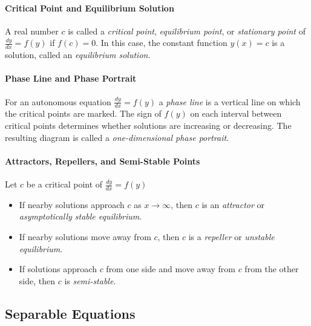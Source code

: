 \documentclass[oneside]{book}
\begin{document}
\paragraph{Critical Point and Equilibrium Solution}{
    A real number $c$ is called a \emph{critical point}, \emph{equilibrium point}, or
    \emph{stationary point} of $\frac{dy}{dx}=f(y)$ if $f(c)=0$. In this case, the constant function $y(x)=c$ is a solution, called an \emph{equilibrium solution}.
}

\paragraph{Phase Line and Phase Portrait}{
    For an autonomous equation $\frac{dy}{dx}=f(y)$ a \emph{phase line} is a vertical line on which the critical points are marked. The sign of $f(y)$ on each interval between critical points determines whether solutions are increasing or decreasing. The resulting diagram is called a \emph{one-dimensional phase portrait}.
}

\paragraph{Attractors, Repellers, and Semi-Stable Points}{
    Let $c$ be a critical point of $\frac{dy}{dx}=f(y)$
    \begin{itemize}
        \item If nearby solutions approach $c$ as $x\to\infty$, then $c$ is an
        \emph{attractor} or \emph{asymptotically stable equilibrium}.
        \item If nearby solutions move away from $c$, then $c$ is a \emph{repeller}
        or \emph{unstable equilibrium}.
        \item If solutions approach $c$ from one side and move away from $c$ from
        the other side, then $c$ is \emph{semi-stable}.
    \end{itemize}
}



\subsection{Separable Equations}

\end{document}
